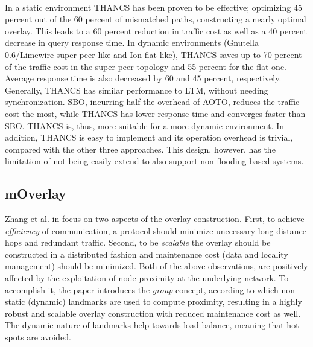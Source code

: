\documentclass[a4paper,10pt]{article}
\begin{document}
\paragraph{}
In a static environment THANCS has been proven to be effective; optimizing 45 percent out of the 60 percent of mismatched paths, constructing a nearly optimal overlay. This leads to a 60 percent reduction in traffic cost as well as a 40 percent decrease in query response time. In dynamic environments (Gnutella 0.6/Limewire super-peer-like and Ion flat-like), THANCS saves up to 70 percent of the traffic cost in the super-peer topology and 55 percent for the flat one. Average response time is also decreased by 60 and 45 percent, respectively. Generally, THANCS has similar performance to LTM, without needing synchronization. SBO, incurring half the  overhead of AOTO, reduces the traffic cost the most, while THANCS has lower response time and converges faster than SBO. THANCS is, thus, more suitable for a more dynamic environment. In addition, THANCS is easy to implement and its operation overhead is trivial, compared with the other three approaches. This design, however, has the limitation of not being easily extend to also support non-flooding-based systems.

\subsection{mOverlay}
Zhang et al. in \cite{zhang_moverlay_2004} focus on two aspects of the overlay construction. First, to achieve \emph{efficiency} of communication, a protocol should minimize unecessary long-distance hops and redundant traffic. Second, to be \emph{scalable} the overlay should be constructed in a distributed fashion and maintenance cost (data and locality management) should be minimized. Both of the above observations, are positively affected by the exploitation of node proximity at the underlying network. To accomplish it, the paper introduces the \emph{group} concept, according to which non-static (dynamic) landmarks are used to compute proximity, resulting in a highly robust and scalable overlay construction with reduced maintenance cost as well. The dynamic nature of landmarks help towards load-balance, meaning that hot-spots are avoided.
\end{document}
